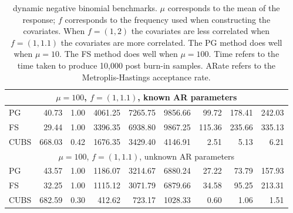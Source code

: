 \documentclass[12pt]{article}
\begin{document}
\begin{table}
\begin{tabular}{l r r r r r r r r }
\hline
 \multicolumn{9}{c}{$\mu=100$, $f = (1,1.1)$, known AR parameters} \\
\hline
             PG   &    40.73 &     1.00 &   4061.25 &   7265.75 &   9856.66 &     99.72 &    178.41 &    242.03 \\ 
             FS   &    29.44 &     1.00 &   3396.35 &   6938.80 &   9867.25 &    115.36 &    235.66 &    335.13 \\ 
           CUBS   &   668.03 &     0.42 &   1676.35 &   3429.40 &   4146.91 &      2.51 &      5.13 &      6.21
 \\ %

\hline
 \multicolumn{9}{c}{$\mu=100$, $f = (1,1.1)$, unknown AR parameters} \\
\hline
             PG   &    43.57 &     1.00 &   1186.07 &   3214.67 &   6880.24 &     27.22 &     73.79 &    157.93 \\ 
             FS   &    32.25 &     1.00 &   1115.12 &   3071.79 &   6879.66 &     34.58 &     95.25 &    213.31 \\ 
           CUBS   &   682.59 &     0.30 &    412.62 &    723.17 &   1028.33 &      0.60 &      1.06 &      1.51
 \end{tabular}
 \caption{\label{tab:dynnb-detail} dynamic negative binomial benchmarks. $\mu$
   corresponds to the mean of the response; $f$ corresponds to the frequency
   used when constructing the covariates.  When $f = (1,2)$ the covariates are
   less correlated when $f=(1,1.1)$ the covariates are more correlated.  The PG
   method does well when $\mu=10$.  The FS method does well when $\mu=100$. Time
   refers to the time taken to produce 10,000 post burn-in samples.  ARate
   refers to the Metroplis-Hastings acceptance rate.}
\end{table}


{}

\end{document}
